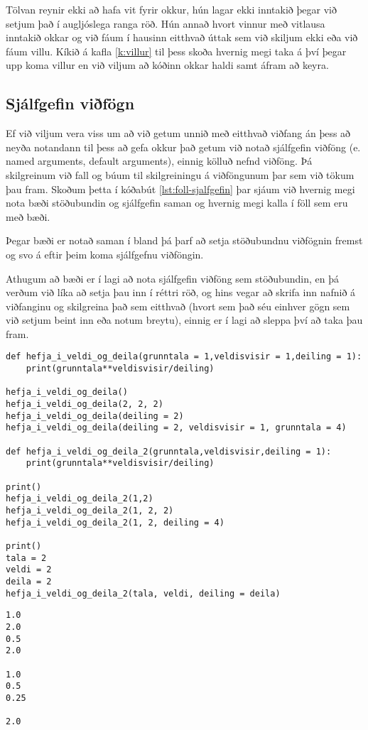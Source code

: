 Tölvan reynir ekki að hafa vit fyrir okkur, hún lagar ekki inntakið þegar við setjum það í augljóslega ranga röð.
Hún annað hvort vinnur með vitlausa inntakið okkar og við fáum í hausinn eitthvað úttak sem við skiljum ekki eða við fáum villu.
Kíkið á kafla \ref{k:villur} til þess skoða hvernig megi taka á því þegar upp koma villur en við viljum að kóðinn okkar haldi samt áfram að keyra.

\subsection{Sjálfgefin viðfögn}\label{uk:föll-sjálfgefin}
Ef við viljum vera viss um að við getum unnið með eitthvað viðfang án þess að neyða notandann til þess að gefa okkur það getum við notað sjálfgefin viðföng (e. named arguments, default arguments), einnig kölluð nefnd viðföng.
Þá skilgreinum við fall og búum til skilgreiningu á viðföngunum þar sem við tökum þau fram.
Skoðum þetta í kóðabút \ref{lst:foll-sjalfgefin} þar sjáum við hvernig megi nota bæði stöðubundin og sjálfgefin saman og hvernig megi kalla í föll sem eru með bæði.

Þegar bæði er notað saman í bland þá þarf að setja stöðubundnu viðfögnin fremst og svo á eftir þeim koma sjálfgefnu viðföngin.

Athugum að bæði er í lagi að nota sjálfgefin viðföng sem stöðubundin, en þá verðum við líka að setja þau inn í réttri röð, og hins vegar að skrifa inn nafnið á viðfanginu og skilgreina það sem eitthvað (hvort sem það séu einhver gögn sem við setjum beint inn eða notum breytu), einnig er í lagi að sleppa því að taka þau fram.

\begin{lstlisting}[caption=Sjálfgefin viðföng kynnt, label=lst:foll-sjalfgefin]
def hefja_i_veldi_og_deila(grunntala = 1,veldisvisir = 1,deiling = 1):	
	print(grunntala**veldisvisir/deiling)
	
hefja_i_veldi_og_deila()
hefja_i_veldi_og_deila(2, 2, 2)
hefja_i_veldi_og_deila(deiling = 2)
hefja_i_veldi_og_deila(deiling = 2, veldisvisir = 1, grunntala = 4)

def hefja_i_veldi_og_deila_2(grunntala,veldisvisir,deiling = 1):	
	print(grunntala**veldisvisir/deiling)

print()
hefja_i_veldi_og_deila_2(1,2) 
hefja_i_veldi_og_deila_2(1, 2, 2) 
hefja_i_veldi_og_deila_2(1, 2, deiling = 4) 

print()
tala = 2
veldi = 2
deila = 2
hefja_i_veldi_og_deila_2(tala, veldi, deiling = deila)
\end{lstlisting}
\lstset{style=uttak}
\begin{lstlisting}
1.0
2.0
0.5
2.0

1.0
0.5
0.25

2.0
\end{lstlisting}
\lstset{style=venjulegt}

